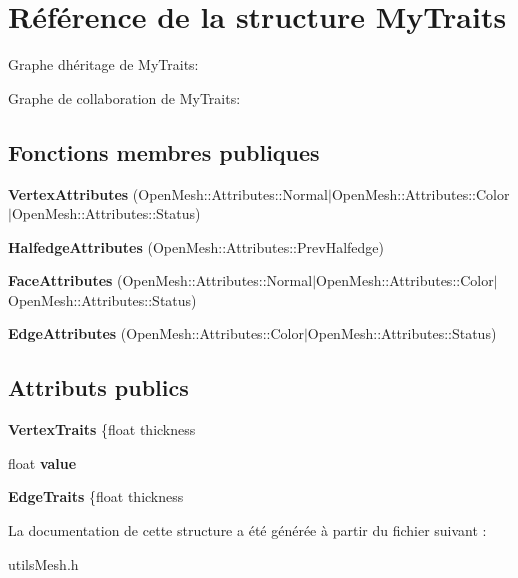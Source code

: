 \hypertarget{structMyTraits}{}\section{Référence de la structure My\+Traits}
\label{structMyTraits}


Graphe d\textquotesingle{}héritage de My\+Traits\+:


Graphe de collaboration de My\+Traits\+:
\subsection*{Fonctions membres publiques}
\begin{DoxyCompactItemize}
\item 
\mbox{\label{structMyTraits_a0d5fc83d5e3f02e26a9dc9f373f95876}} 
{\bfseries Vertex\+Attributes} (Open\+Mesh\+::\+Attributes\+::\+Normal$\vert$Open\+Mesh\+::\+Attributes\+::\+Color$\vert$Open\+Mesh\+::\+Attributes\+::\+Status)
\item 
\mbox{\label{structMyTraits_aade3f1e764750e0eac8008a814b98ae1}} 
{\bfseries Halfedge\+Attributes} (Open\+Mesh\+::\+Attributes\+::\+Prev\+Halfedge)
\item 
\mbox{\label{structMyTraits_adebf5f8b8be951c9942ac293cd14c4b9}} 
{\bfseries Face\+Attributes} (Open\+Mesh\+::\+Attributes\+::\+Normal$\vert$Open\+Mesh\+::\+Attributes\+::\+Color$\vert$Open\+Mesh\+::\+Attributes\+::\+Status)
\item 
\mbox{\label{structMyTraits_ad651e8bf7eecb2d6b71f4f12f77b9d57}} 
{\bfseries Edge\+Attributes} (Open\+Mesh\+::\+Attributes\+::\+Color$\vert$Open\+Mesh\+::\+Attributes\+::\+Status)
\end{DoxyCompactItemize}
\subsection*{Attributs publics}
\begin{DoxyCompactItemize}
\item 
\mbox{\label{structMyTraits_ac77671eff45753af5f4fd2d456de9286}} 
{\bfseries Vertex\+Traits} \{float thickness
\item 
\mbox{\label{structMyTraits_a1b5207e06cbe83eb7761a16076885c01}} 
float {\bfseries value}
\item 
\mbox{\label{structMyTraits_a77586508c7334a556e57a2b189feb11a}} 
{\bfseries Edge\+Traits} \{float thickness
\end{DoxyCompactItemize}


La documentation de cette structure a été générée à partir du fichier suivant \+:\begin{DoxyCompactItemize}
\item 
utils\+Mesh.\+h\end{DoxyCompactItemize}
